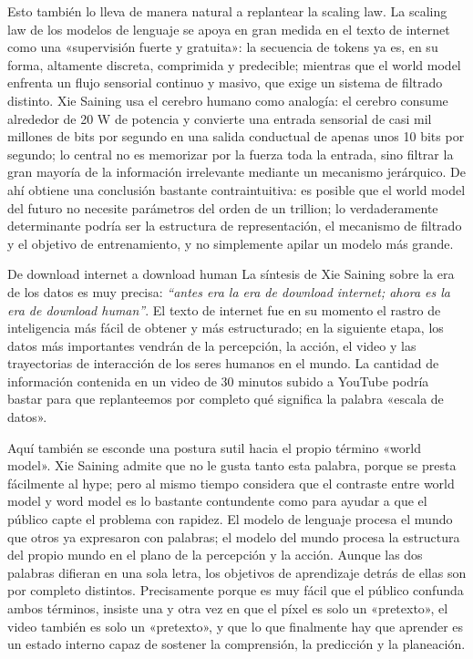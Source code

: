 \documentclass[a4paper,12pt]{article}
\begin{document}
Esto también lo lleva de manera natural a replantear la scaling law. La scaling law de los modelos de lenguaje se apoya en gran medida en el texto de internet como una «supervisión fuerte y gratuita»: la secuencia de tokens ya es, en su forma, altamente discreta, comprimida y predecible; mientras que el world model enfrenta un flujo sensorial continuo y masivo, que exige un sistema de filtrado distinto. Xie Saining usa el cerebro humano como analogía: el cerebro consume alrededor de 20 W de potencia y convierte una entrada sensorial de casi mil millones de bits por segundo en una salida conductual de apenas unos 10 bits por segundo; lo central no es memorizar por la fuerza toda la entrada, sino filtrar la gran mayoría de la información irrelevante mediante un mecanismo jerárquico. De ahí obtiene una conclusión bastante contraintuitiva: es posible que el world model del futuro no necesite parámetros del orden de un trillion; lo verdaderamente determinante podría ser la estructura de representación, el mecanismo de filtrado y el objetivo de entrenamiento, y no simplemente apilar un modelo más grande.

\begin{importantbox}{De download internet a download human}
La síntesis de Xie Saining sobre la era de los datos es muy precisa: \textit{``antes era la era de download internet; ahora es la era de download human''}. El texto de internet fue en su momento el rastro de inteligencia más fácil de obtener y más estructurado; en la siguiente etapa, los datos más importantes vendrán de la percepción, la acción, el video y las trayectorias de interacción de los seres humanos en el mundo. La cantidad de información contenida en un video de 30 minutos subido a YouTube podría bastar para que replanteemos por completo qué significa la palabra «escala de datos».
\end{importantbox}

Aquí también se esconde una postura sutil hacia el propio término «world model». Xie Saining admite que no le gusta tanto esta palabra, porque se presta fácilmente al hype; pero al mismo tiempo considera que el contraste entre world model y word model es lo bastante contundente como para ayudar a que el público capte el problema con rapidez. El modelo de lenguaje procesa el mundo que otros ya expresaron con palabras; el modelo del mundo procesa la estructura del propio mundo en el plano de la percepción y la acción. Aunque las dos palabras difieran en una sola letra, los objetivos de aprendizaje detrás de ellas son por completo distintos. Precisamente porque es muy fácil que el público confunda ambos términos, insiste una y otra vez en que el píxel es solo un «pretexto», el video también es solo un «pretexto», y que lo que finalmente hay que aprender es un estado interno capaz de sostener la comprensión, la predicción y la planeación.
\end{document}

